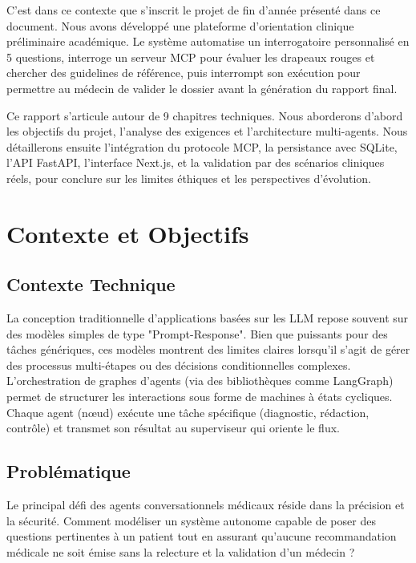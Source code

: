 \documentclass[11pt,a4paper]{report}
\begin{document}
C'est dans ce contexte que s'inscrit le projet de fin d'année présenté dans ce document. Nous avons développé une plateforme d'orientation clinique préliminaire académique. Le système automatise un interrogatoire personnalisé en 5 questions, interroge un serveur MCP pour évaluer les drapeaux rouges et chercher des guidelines de référence, puis interrompt son exécution pour permettre au médecin de valider le dossier avant la génération du rapport final.

Ce rapport s'articule autour de 9 chapitres techniques. Nous aborderons d'abord les objectifs du projet, l'analyse des exigences et l'architecture multi-agents. Nous détaillerons ensuite l'intégration du protocole MCP, la persistance avec SQLite, l'API FastAPI, l'interface Next.js, et la validation par des scénarios cliniques réels, pour conclure sur les limites éthiques et les perspectives d'évolution.


\chapter{Contexte et Objectifs}
\section{Contexte Technique}
La conception traditionnelle d'applications basées sur les LLM repose souvent sur des modèles simples de type "Prompt-Response". Bien que puissants pour des tâches génériques, ces modèles montrent des limites claires lorsqu'il s'agit de gérer des processus multi-étapes ou des décisions conditionnelles complexes. 
L'orchestration de graphes d'agents (via des bibliothèques comme LangGraph) permet de structurer les interactions sous forme de machines à états cycliques. Chaque agent (nœud) exécute une tâche spécifique (diagnostic, rédaction, contrôle) et transmet son résultat au superviseur qui oriente le flux.

\section{Problématique}
Le principal défi des agents conversationnels médicaux réside dans la précision et la sécurité. Comment modéliser un système autonome capable de poser des questions pertinentes à un patient tout en assurant qu'aucune recommandation médicale ne soit émise sans la relecture et la validation d'un médecin ?
\end{document}
